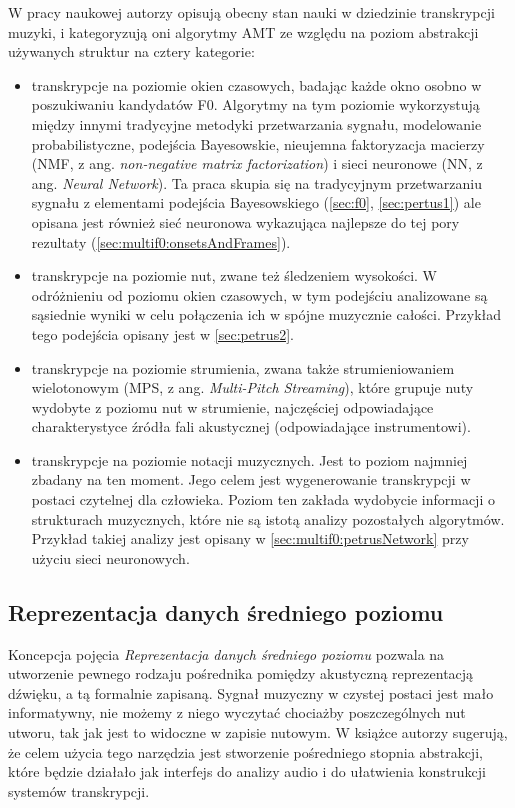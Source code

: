 \documentclass[12pt,a4paper,twoside]{mwart}
\begin{document}
W pracy naukowej \cite[3-4]{DBLP:journals/spm/BenetosDDE19} autorzy opisują obecny stan nauki w dziedzinie transkrypcji muzyki, i kategoryzują oni algorytmy AMT ze względu na poziom abstrakcji używanych struktur na cztery kategorie:
\begin{itemize}
  \item transkrypcje na poziomie okien czasowych, badając każde okno osobno w poszukiwaniu kandydatów F0. Algorytmy na tym poziomie wykorzystują między innymi tradycyjne metodyki przetwarzania sygnału, modelowanie probabilistyczne, podejścia Bayesowskie, nieujemna faktoryzacja macierzy (NMF, z ang. \textit{non-negative matrix factorization}) i sieci neuronowe (NN, z ang. \textit{Neural Network}). Ta praca skupia się na tradycyjnym przetwarzaniu sygnału z elementami podejścia Bayesowskiego (\ref{sec:f0}, \ref{sec:pertus1}) ale opisana jest również sieć neuronowa wykazująca najlepsze do tej pory rezultaty (\ref{sec:multif0:onsetsAndFrames}).
  \item transkrypcje na poziomie nut, zwane też śledzeniem wysokości. W odróżnieniu od poziomu okien czasowych, w tym podejściu analizowane są sąsiednie wyniki w celu połączenia ich w spójne muzycznie całości. Przykład tego podejścia opisany jest w \ref{sec:petrus2}.
  \item transkrypcje na poziomie strumienia, zwana także strumieniowaniem wielotonowym (MPS, z ang. \textit{Multi-Pitch Streaming}), które grupuje nuty wydobyte z poziomu nut w strumienie, najczęściej odpowiadające charakterystyce źródła fali akustycznej (odpowiadające instrumentowi).
  \item transkrypcje na poziomie notacji muzycznych. Jest to poziom najmniej zbadany na ten moment. Jego celem jest wygenerowanie transkrypcji w postaci czytelnej dla człowieka. Poziom ten zakłada wydobycie informacji  o strukturach muzycznych, które nie są istotą analizy pozostałych algorytmów. Przykład takiej analizy jest opisany w \ref{sec:multif0:petrusNetwork} przy użyciu sieci neuronowych.
\end{itemize}


\subsection{Reprezentacja danych średniego poziomu}
Koncepcja pojęcia \textit{Reprezentacja danych średniego poziomu} pozwala na utworzenie pewnego rodzaju pośrednika pomiędzy akustyczną reprezentacją dźwięku, a tą formalnie zapisaną. Sygnał muzyczny w czystej postaci jest mało informatywny, nie możemy z niego wyczytać chociażby poszczególnych nut utworu, tak jak jest to widoczne w zapisie nutowym. W książce \cite{Transcription:Zatorre:AuditoryCortex} autorzy sugerują, że celem użycia tego narzędzia jest stworzenie pośredniego stopnia abstrakcji, które będzie działało jak interfejs do analizy audio i do ułatwienia konstrukcji systemów transkrypcji.
\end{document}
